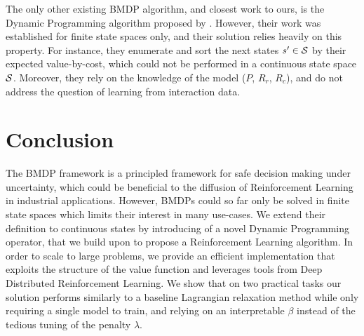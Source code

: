 \documentclass{article}
\begin{document}
The only other existing BMDP algorithm, and closest work to ours, is the Dynamic Programming algorithm proposed by \citet{Boutilier_Lu:uai16}. However, their work was established for finite state spaces only, and their solution relies heavily on this property. For instance, they enumerate and sort the next states $s'\in\mathcal{S}$ by their expected value-by-cost, which could not be performed in a continuous state space $\mathcal{S}$. Moreover, they rely on the knowledge of the model ($P$, $R_r$, $R_c$), and do not address the question of learning from interaction data.

\section{Conclusion}
\label{sec:conclusion}
The BMDP framework is a principled framework for safe decision making under uncertainty, which could be beneficial to the diffusion of Reinforcement Learning in industrial applications. However, BMDPs could so far only be solved in finite state spaces which limits their interest in many use-cases. We extend their definition to continuous states by introducing of a novel Dynamic Programming operator, that we build upon to propose a Reinforcement Learning algorithm. In order to scale to large problems, we provide an efficient implementation that exploits the structure of the value function and leverages tools from Deep Distributed Reinforcement Learning. We show that on two practical tasks our solution performs similarly to a baseline Lagrangian relaxation method while only requiring a single model to train, and relying on an interpretable $\beta$ instead of the tedious tuning of the penalty $\lambda$.



%
\clearpage



\clearpage

\end{document}
